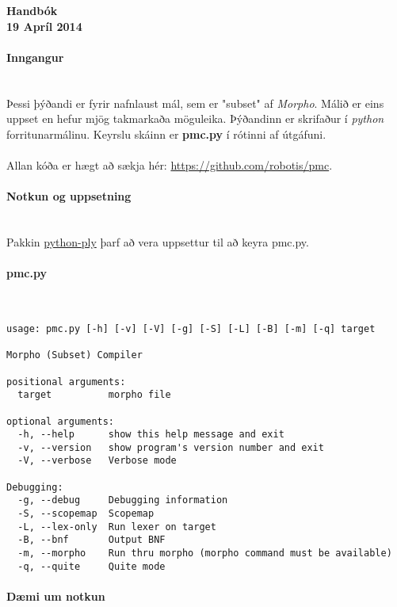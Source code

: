 \documentclass{article}
\begin{document}
\begin{center}
{\LARGE \textbf{Handbók}} ~\\
\textbf{19 Apríl 2014}
\end{center}

\clearpage
\paragraph{\Large Inngangur} ~\\

Þessi þýðandi er fyrir nafnlaust mál, sem er "subset" af \emph{Morpho}. Málið er eins uppset en
hefur mjög takmarkaða möguleika. Þýðandinn er skrifaður í \emph{python} forritunarmálinu. Keyrslu skáinn er \textbf{pmc.py} 
í rótinni af útgáfuni.
~\\
~\\
Allan kóða er hægt að sækja hér: \url{https://github.com/robotis/pmc}.

\clearpage
\paragraph{{\Large Notkun og uppsetning}} ~\\

Pakkin \href{http://www.dabeaz.com/ply/ply.html}{python-ply} þarf að vera uppsettur til að keyra pmc.py.

\paragraph{pmc.py} ~\\

\begin{verbatim}
usage: pmc.py [-h] [-v] [-V] [-g] [-S] [-L] [-B] [-m] [-q] target

Morpho (Subset) Compiler

positional arguments:
  target          morpho file

optional arguments:
  -h, --help      show this help message and exit
  -v, --version   show program's version number and exit
  -V, --verbose   Verbose mode

Debugging:
  -g, --debug     Debugging information
  -S, --scopemap  Scopemap
  -L, --lex-only  Run lexer on target
  -B, --bnf       Output BNF
  -m, --morpho    Run thru morpho (morpho command must be available)
  -q, --quite     Quite mode

\end{verbatim}

\clearpage
\paragraph{Dæmi um notkun} ~\\
\end{document}
